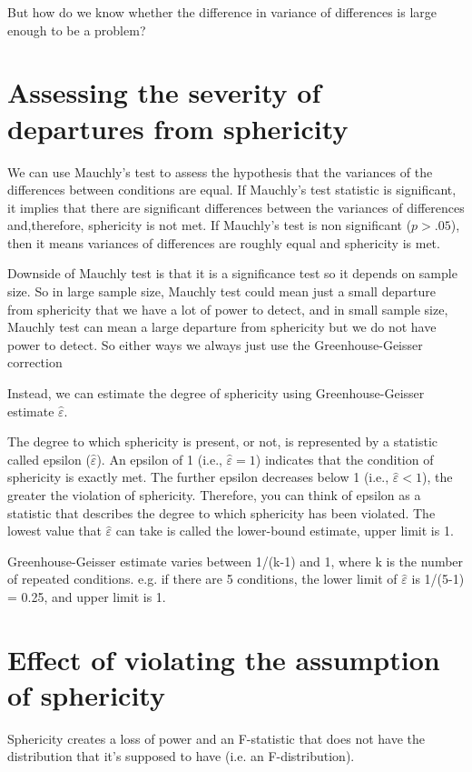 But how do we know whether the difference in variance of differences is large enough to be a problem?

\section{Assessing the severity of departures from sphericity}
We can use Mauchly's test to assess the hypothesis that the variances of the differences between conditions are equal. If Mauchly's test statistic is significant, it implies that there are significant differences between the variances of differences and,therefore, sphericity is not met.  If Mauchly's test is non significant ($p > .05$), then it means variances of differences are roughly equal and sphericity is met.

Downside of Mauchly test is that it is a significance test so it depends on sample size. So in large sample size, Mauchly test could mean just a small departure from sphericity that we have a lot of power to detect, and in small sample size, Mauchly test can mean a large departure from sphericity but we do not have power to detect. So either ways we always just use the Greenhouse-Geisser correction

Instead, we can estimate the degree of sphericity using Greenhouse-Geisser estimate $\hat{\varepsilon}$. 

The degree to which sphericity is present, or not, is represented by a statistic called epsilon ($\hat{\varepsilon}$). An epsilon of 1 (i.e., $\hat{\varepsilon} = 1$) indicates that the condition of sphericity is exactly met. The further epsilon decreases below 1 (i.e., $\hat{\varepsilon}< 1$), the greater the violation of sphericity. Therefore, you can think of epsilon as a statistic that describes the degree to which sphericity has been violated. The lowest value that  $\hat{\varepsilon}$ can take is called the lower-bound estimate, upper limit is 1. 

Greenhouse-Geisser estimate varies between 1/(k-1) and 1, where k is the number of repeated conditions. e.g. if there are 5 conditions, the lower limit of $\hat{\varepsilon}$ is 1/(5-1) = 0.25, and upper limit is 1.

\section{Effect of violating the assumption of sphericity}
Sphericity creates a loss of power and an F-statistic that does not have the distribution that it's supposed to have (i.e. an F-distribution).

